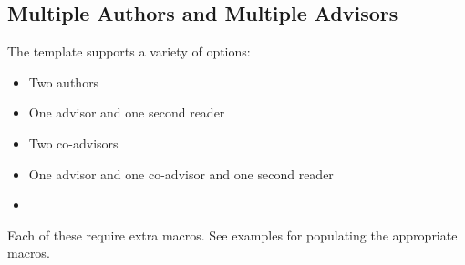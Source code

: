 \subsection{Multiple Authors and Multiple Advisors}
The template supports a variety of options:
\begin{itemize}
\item Two authors
\item One advisor and one second reader
\item Two co-advisors
\item One advisor and one co-advisor and one second reader
\item \etc
\end{itemize}
Each of these require extra macros. See examples for populating the appropriate macros.
